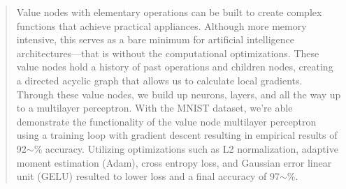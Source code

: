 \begin{abstract}
{ 
Value nodes with elementary operations can be built to create complex
functions that achieve practical appliances. Although more memory intensive,
this serves as a bare minimum for artificial intelligence architectures---that is 
without the computational optimizations. These value nodes hold a history of past 
operations and children nodes, creating a directed acyclic graph that allows us to 
calculate local gradients. Through these value nodes, we build up neurons, layers, and
all the way up to a multilayer perceptron. With the MNIST dataset, we're able demonstrate the functionality
of the value node multilayer perceptron using a training loop with gradient descent
resulting in empirical results of 92$\sim$\% accuracy. Utilizing optimizations such as L2 normalization,
adaptive moment estimation (Adam), cross entropy loss, and Gaussian error linear unit (GELU) resulted
to lower loss and a final accuracy of 97$\sim$\%.
\vspace{4ex}}
\end{abstract}




